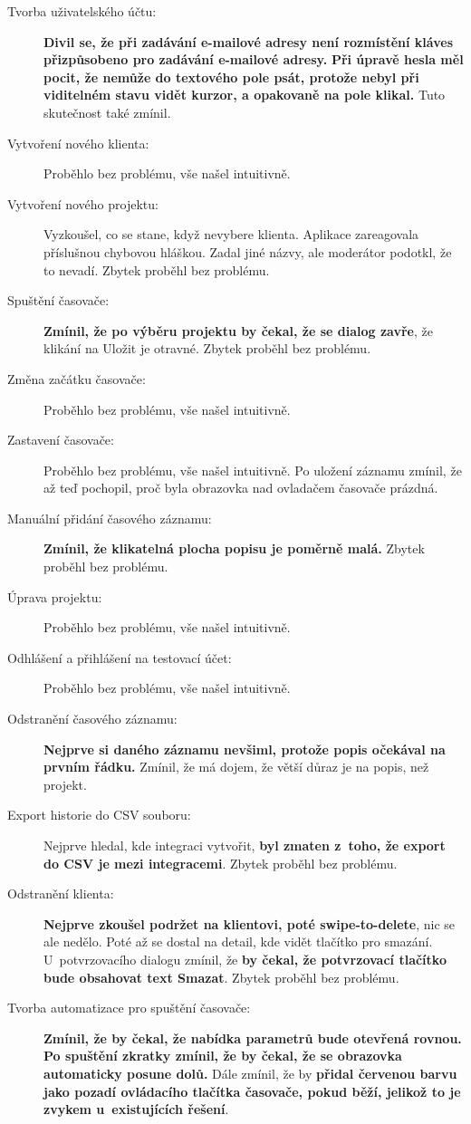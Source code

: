 \begin{description}
\item[Tvorba uživatelského účtu:] \textbf{Divil se, že při zadávání e-mailové adresy není rozmístění kláves přizpůsobeno pro zadávání e-mailové adresy.} \textbf{Při úpravě hesla měl pocit, že nemůže do textového pole psát, protože nebyl při viditelném stavu vidět kurzor, a opakovaně na pole klikal.} Tuto skutečnost také zmínil.
\item[Vytvoření nového klienta:] Proběhlo bez problému, vše našel intuitivně.
\item[Vytvoření nového projektu:] Vyzkoušel, co se stane, když nevybere klienta. Aplikace zareagovala příslušnou chybovou hláškou. Zadal jiné názvy, ale moderátor podotkl, že to nevadí. Zbytek proběhl bez problému.
\item[Spuštění časovače:] \textbf{Zmínil, že po výběru projektu by čekal, že se dialog zavře}, že klikání na Uložit je otravné. Zbytek proběhl bez problému.
\item[Změna začátku časovače:] Proběhlo bez problému, vše našel intuitivně.
\item[Zastavení časovače:] Proběhlo bez problému, vše našel intuitivně. Po uložení záznamu zmínil, že až teď pochopil, proč byla obrazovka nad ovladačem časovače prázdná.
\item[Manuální přidání časového záznamu:] \textbf{Zmínil, že klikatelná plocha popisu je poměrně malá.} Zbytek proběhl bez problému.
\item[Úprava projektu:] Proběhlo bez problému, vše našel intuitivně.
\item[Odhlášení a přihlášení na testovací účet:] Proběhlo bez problému, vše našel intuitivně.
\item[Odstranění časového záznamu:] \textbf{Nejprve si daného záznamu nevšiml, protože popis očekával na prvním řádku.} Zmínil, že má dojem, že větší důraz je na popis, než projekt.
\item[Export historie do CSV souboru:] Nejprve hledal, kde integraci vytvořit, \textbf{byl zmaten z~toho, že export do CSV je mezi integracemi}. Zbytek proběhl bez problému.
\item[Odstranění klienta:] \textbf{Nejprve zkoušel podržet na klientovi, poté swipe-to-delete}, nic se ale nedělo. Poté až se dostal na detail, kde vidět tlačítko pro smazání. U~potvrzovacího dialogu zmínil, že \textbf{by čekal, že potvrzovací tlačítko bude obsahovat text Smazat}. Zbytek proběhl bez problému.
\item[Tvorba automatizace pro spuštění časovače:] \textbf{Zmínil, že by čekal, že nabídka parametrů bude otevřená rovnou.} \textbf{Po spuštění zkratky zmínil, že by čekal, že se obrazovka automaticky posune dolů.} Dále zmínil, že by \textbf{přidal červenou barvu jako pozadí ovládacího tlačítka časovače, pokud běží, jelikož to je zvykem u~existujících řešení}.

\end{description}
